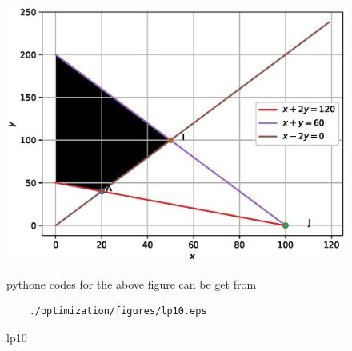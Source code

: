 \begin{enumerate}[label=\arabic*.,ref=\thesubsection.\theenumi]
\begin{figure}[!ht]
	\centering
	\includegraphics[width=\columnwidth]{./figures/lp10.eps}
	\caption{ lp10}
	\label{fig:lp10}
	pythone codes for the above figure can be get from
	\begin{lstlisting}
	./optimization/figures/lp10.eps
	\end{lstlisting}	
\end{figure}
\end{enumerate}